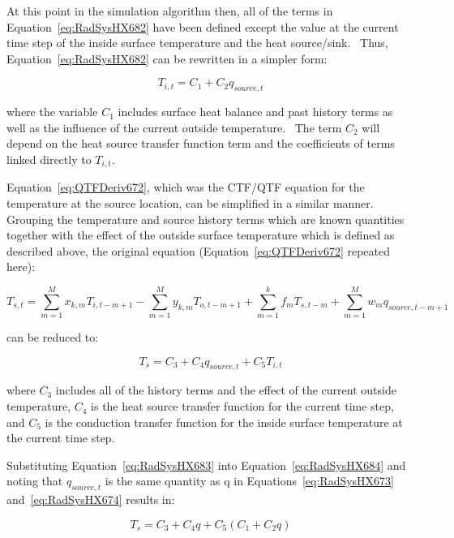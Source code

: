 At this point in the simulation algorithm then, all of the terms in Equation~\ref{eq:RadSysHX682} have been defined except the value at the current time step of the inside surface temperature and the heat source/sink.~ Thus, Equation~\ref{eq:RadSysHX682} can be rewritten in a simpler form:

\begin{equation}
{T_{i,t}} = {C_1} + {C_2}{q_{source,t}}
\label{eq:RadSysHX683}
\end{equation}

where the variable \(C_1\) includes surface heat balance and past history terms as well as the influence of the current outside temperature.~ The term \(C_2\) will depend on the heat source transfer function term and the coefficients of terms linked directly to \(T_{i,t}\).

Equation~\ref{eq:QTFDeriv672}, which was the CTF/QTF equation for the temperature at the source location, can be simplified in a similar manner.~ Grouping the temperature and source history terms which are known quantities together with the effect of the outside surface temperature which is defined as described above, the original equation (Equation~\ref{eq:QTFDeriv672} repeated here):

\begin{equation}
{T_{s,t}} = \sum\limits_{m = 1}^M {{x_{k,m}}{T_{i,t - m + 1}}}  - \sum\limits_{m = 1}^M {{y_{k,m}}{T_{o,t - m + 1}}}  + \sum\limits_{m = 1}^k {{f_m}{T_{s,t - m}}}  + \sum\limits_{m = 1}^M {{w_m}{q_{source,t - m + 1}}}
\end{equation}

can be reduced to:

\begin{equation}
{T_s} = {C_3} + {C_4}{q_{source,t}} + {C_5}{T_{i,t}}
\label{eq:RadSysHX684}
\end{equation}

where \(C_3\) includes all of the history terms and the effect of the current outside temperature, \(C_4\) is the heat source transfer function for the current time step, and \(C_5\) is the conduction transfer function for the inside surface temperature at the current time step.

Substituting Equation~\ref{eq:RadSysHX683} into Equation~\ref{eq:RadSysHX684} and noting that \(q_{source,t}\) is the same quantity as q in Equations~\ref{eq:RadSysHX673} and~\ref{eq:RadSysHX674} results in:

\begin{equation}
{T_s} = {C_3} + {C_4}q + {C_5}\left( {{C_1} + {C_2}q} \right)
\end{equation}


